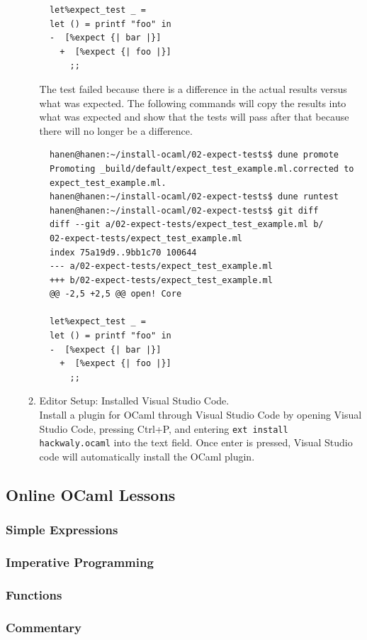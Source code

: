 \begin{enumerate}
\begin{enumerate}
\begin{verbatim}
  let%expect_test _ =
  let () = printf "foo" in
  -  [%expect {| bar |}]
    +  [%expect {| foo |}]
      ;;
\end{verbatim}
The test failed because there is a difference in the actual results versus what was expected. The following commands will copy the results into what was expected and show that the tests will pass after that because there will no longer be a difference. 
\begin{verbatim}
  hanen@hanen:~/install-ocaml/02-expect-tests$ dune promote
  Promoting _build/default/expect_test_example.ml.corrected to 
  expect_test_example.ml.
  hanen@hanen:~/install-ocaml/02-expect-tests$ dune runtest
  hanen@hanen:~/install-ocaml/02-expect-tests$ git diff
  diff --git a/02-expect-tests/expect_test_example.ml b/
  02-expect-tests/expect_test_example.ml
  index 75a19d9..9bb1c70 100644
  --- a/02-expect-tests/expect_test_example.ml
  +++ b/02-expect-tests/expect_test_example.ml
  @@ -2,5 +2,5 @@ open! Core
  
  let%expect_test _ =
  let () = printf "foo" in
  -  [%expect {| bar |}]
    +  [%expect {| foo |}]
      ;;
\end{verbatim}
\item Editor Setup: Installed Visual Studio Code.  \\Install a plugin
  for OCaml through Visual Studio Code by opening Visual Studio Code,
  pressing Ctrl+P, and entering \texttt{ext install
    hackwaly.ocaml} into the text
  field. Once enter is pressed, Visual Studio code will automatically
  install the OCaml plugin.
  \end{enumerate}
\end{enumerate}
\subsection{Online OCaml Lessons}

\subsubsection{Simple Expressions}
\subsubsection{Imperative Programming}
\subsubsection{Functions}
\subsubsection{Commentary}
